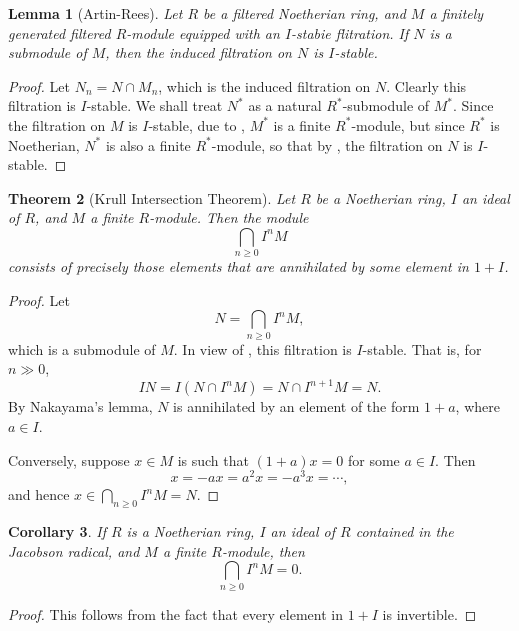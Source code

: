 \documentclass[11pt]{article}
\theoremstyle{thmstyle}
\newtheorem{theorem}{Theorem}[section]
\newtheorem{lemma}[theorem]{Lemma}
\theoremstyle{defstyle}
\newtheorem{corollary}[theorem]{Corollary}
\renewcommand{\ge}{\geqslant}
\begin{document}
\begin{lemma}[Artin-Rees]
    Let $R$ be a filtered Noetherian ring, and $M$ a finitely generated filtered $R$-module equipped with an $I$-stabie flitration. If $N$ is a submodule of $M$, then the induced filtration on $N$ is $I$-stable.
\end{lemma}
\begin{proof}
    Let $N_n = N\cap M_n$, which is the induced filtration on $N$. Clearly this filtration is $I$-stable. We shall treat $N^\ast$ as a natural $R^\ast$-submodule of $M^\ast$. Since the filtration on $M$ is $I$-stable, due to , $M^\ast$ is a finite $R^\ast$-module, but since $R^\ast$ is Noetherian, $N^\ast$ is also a finite $R^\ast$-module, so that by , the filtration on $N$ is $I$-stable.
\end{proof}

\begin{theorem}[Krull Intersection Theorem]
    Let $R$ be a Noetherian ring, $I$ an ideal of $R$, and $M$ a finite $R$-module. Then the module 
    \begin{equation*}
        \bigcap_{n\ge 0} I^n M
    \end{equation*}
    consists of precisely those elements that are annihilated by some element in $1 + I$.
\end{theorem}
\begin{proof}
    Let 
    \begin{equation*}
        N = \bigcap_{n\ge 0} I^n M,
    \end{equation*}
    which is a submodule of $M$. In view of , this filtration is $I$-stable. That is, for $n\gg 0$, 
    \begin{equation*}
        IN = I\left(N\cap I^n M\right) = N\cap I^{n + 1} M = N.
    \end{equation*}
    By Nakayama's lemma, $N$ is annihilated by an element of the form $1 + a$, where $a\in I$.

    Conversely, suppose $x\in M$ is such that $(1 + a)x = 0$ for some $a\in I$. Then 
    \begin{equation*}
        x = -ax = a^2 x = -a^3 x = \cdots,
    \end{equation*}
    and hence $x\in\bigcap_{n\ge 0} I^n M = N$.
\end{proof}

\begin{corollary}
    If $R$ is a Noetherian ring, $I$ an ideal of $R$ contained in the Jacobson radical, and $M$ a finite $R$-module, then 
    \begin{equation*}
        \bigcap_{n\ge 0} I^n M = 0.
    \end{equation*}
\end{corollary}
\begin{proof}
    This follows from the fact that every element in $1 + I$ is invertible.
\end{proof}
\end{document}
